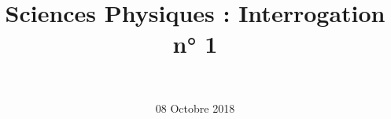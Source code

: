 \documentclass[a4paper,11pt]{exam}
\author{\ }
\date{08 Octobre 2018}
\title{Sciences Physiques : Interrogation n° 1}
\begin{document}
%	

	\maketitle
%	
	
	

%

%





 
%
\ \label{LastPage}
\end{document}
